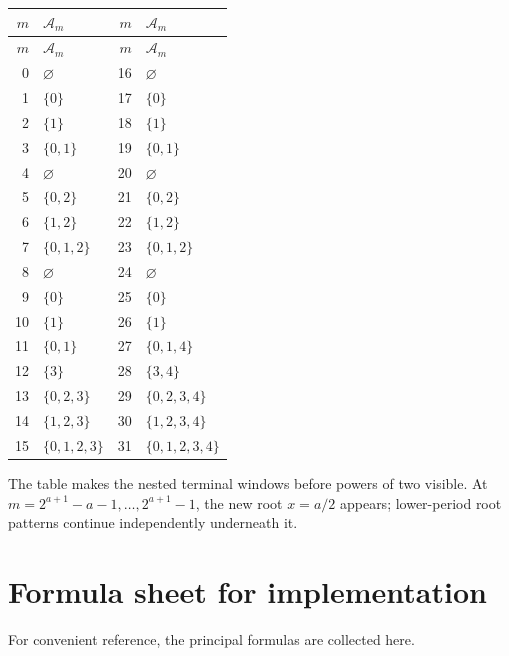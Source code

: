 \documentclass[11pt,oneside]{article}
\numberwithin{equation}{section}
\theoremstyle{definition}
\theoremstyle{remark}
\begin{document}
\begin{center}
\small
\begin{longtable}{r@{\quad}l|r@{\quad}l}
\toprule
$m$ & $\mathcal A_m$ & $m$ & $\mathcal A_m$\\
\midrule
\endfirsthead
\toprule
$m$ & $\mathcal A_m$ & $m$ & $\mathcal A_m$\\
\midrule
\endhead
0&$\varnothing$&16&$\varnothing$\\
1&$\{0\}$&17&$\{0\}$\\
2&$\{1\}$&18&$\{1\}$\\
3&$\{0,1\}$&19&$\{0,1\}$\\
4&$\varnothing$&20&$\varnothing$\\
5&$\{0,2\}$&21&$\{0,2\}$\\
6&$\{1,2\}$&22&$\{1,2\}$\\
7&$\{0,1,2\}$&23&$\{0,1,2\}$\\
8&$\varnothing$&24&$\varnothing$\\
9&$\{0\}$&25&$\{0\}$\\
10&$\{1\}$&26&$\{1\}$\\
11&$\{0,1\}$&27&$\{0,1,4\}$\\
12&$\{3\}$&28&$\{3,4\}$\\
13&$\{0,2,3\}$&29&$\{0,2,3,4\}$\\
14&$\{1,2,3\}$&30&$\{1,2,3,4\}$\\
15&$\{0,1,2,3\}$&31&$\{0,1,2,3,4\}$\\
\bottomrule
\end{longtable}
\end{center}

The table makes the nested terminal windows before powers of two visible.  At
$m=2^{a+1}-a-1,\ldots,2^{a+1}-1$, the new root $x=a/2$ appears; lower-period
root patterns continue independently underneath it.
\section{Formula sheet for implementation}
\label{p3:c:app:formula-sheet}

For convenient reference, the principal formulas are collected here.
\end{document}
